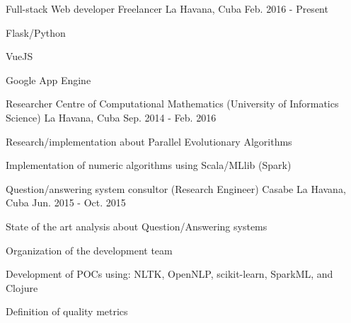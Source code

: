 


\begin{cventries}


\cventry
{Full-stack Web developer} %
{Freelancer} %
{La Havana, Cuba} %
{Feb. 2016 - Present} %
{ %
\begin{cvitems}
\item {Flask/Python}
\item {VueJS}
\item {Google App Engine}
\end{cvitems}
}


\cventry
{Researcher} %
{Centre of Computational Mathematics (University of Informatics Science)} %
{La Havana, Cuba} %
{Sep. 2014 - Feb. 2016} %
{ %
\begin{cvitems}
\item {Research/implementation about Parallel Evolutionary Algorithms}
\item {Implementation of numeric algorithms using Scala/MLlib (Spark)}
\end{cvitems}
}


\cventry
{Question/answering system consultor (Research Engineer)} %
{Casabe} %
{La Havana, Cuba} %
{Jun. 2015 - Oct. 2015} %
{ %
\begin{cvitems}
\item {State of the art analysis about Question/Answering systems}
\item {Organization of the development team}
\item {Development of POCs using: NLTK, OpenNLP, scikit-learn, SparkML, and Clojure}
\item {Definition of quality metrics}
\end{cvitems}
}


\end{cventries}

